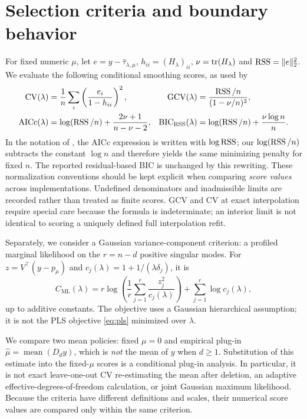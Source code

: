 \section{Selection criteria and boundary behavior}\label{sec:criteria}
For fixed numeric $\mu$, let $e=y-\widehat\tau_{\lambda,\mu}$, $h_{ii}=(H_\lambda)_{ii}$, $\nu=\operatorname{tr}(H_\lambda)$ and $\operatorname{RSS}=\|e\|_2^2$. We evaluate the following conditional smoothing scores, as used by \citet{cortes2017}
\begin{align}
\mathrm{CV}(\lambda)&=\frac1n\sum_i\left(\frac{e_i}{1-h_{ii}}\right)^2,
&
\mathrm{GCV}(\lambda)&=\frac{\operatorname{RSS}/n}{(1-\nu/n)^2},
\label{eq:cvgcv}\\
\mathrm{AICc}(\lambda)&=\log(\operatorname{RSS}/n)+\frac{2\nu+1}{n-\nu-2},
&
\mathrm{BIC}_{\mathrm{RSS}}(\lambda)&=\log(\operatorname{RSS}/n)+\frac{\nu\log n}{n}.
\label{eq:aicbic}
\end{align}
In the notation of \citet{cortes2017}, the AICc expression is written with $\log\operatorname{RSS}$; our $\log(\operatorname{RSS}/n)$ subtracts the constant $\log n$ and therefore yields the same minimizing penalty for fixed $n$. The reported residual-based BIC is unchanged by this rewriting. These normalization conventions should be kept explicit when comparing \emph{score values} across implementations.
Undefined denominators and inadmissible limits are recorded rather than treated as finite scores. GCV and CV at exact interpolation require special care because the formula is indeterminate; an interior limit is not identical to scoring a uniquely defined full interpolation refit.

Separately, we consider a Gaussian variance-component criterion: a profiled marginal likelihood on the $r=n-d$ positive singular modes. For $z=V^\top(y-p_\mu)$ and $c_j(\lambda)=1+1/(\lambda\delta_j)$, it is
\begin{equation}\label{eq:mle}
C_{\mathrm{ML}}(\lambda)=r\log\left(\frac1r\sum_{j=1}^r
\frac{z_j^2}{c_j(\lambda)}\right)+\sum_{j=1}^r\log c_j(\lambda),
\end{equation}
up to additive constants. The objective uses a Gaussian hierarchical assumption; it is not the PLS objective \eqref{eq:pls} minimized over $\lambda$.

We compare two mean policies: fixed $\mu=0$ and empirical plug-in $\widehat\mu=\operatorname{mean}(D_dy)$, which is \emph{not} the mean of $y$ when $d\ge1$. Substitution of this estimate into the fixed-$\mu$ scores is a conditional plug-in analysis. In particular, it is not exact leave-one-out CV re-estimating the mean after deletion, an adaptive effective-degrees-of-freedom calculation, or joint Gaussian maximum likelihood. Because the criteria have different definitions and scales, their numerical score values are compared only within the same criterion.

